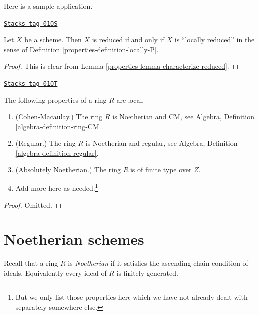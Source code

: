 Here is a sample application.

\begin{lemma}
\label{properties-lemma-reduced-is-locally-reduced}
\href{https://stacks.math.columbia.edu/tag/01OS}{\texttt{Stacks tag 01OS}}

Let $X$ be a scheme. Then $X$ is reduced if and only if $X$ is
``locally reduced'' in the sense of Definition \ref{properties-definition-locally-P}.
\end{lemma}

\begin{proof}

This is clear from Lemma \ref{properties-lemma-characterize-reduced}.
\end{proof}

\begin{lemma}
\label{properties-lemma-properties-local}
\href{https://stacks.math.columbia.edu/tag/01OT}{\texttt{Stacks tag 01OT}}

The following properties of a ring $R$ are local.
\begin{enumerate}
\item (Cohen-Macaulay.)
The ring $R$ is Noetherian and CM, see
Algebra, Definition \ref{algebra-definition-ring-CM}.
\item (Regular.)
The ring $R$ is Noetherian and regular, see
Algebra, Definition \ref{algebra-definition-regular}.
\item (Absolutely Noetherian.)
The ring $R$ is of finite type over $Z$.
\item Add more here as needed.\footnote{But we only list those properties
here which we have not already dealt with separately somewhere else.}
\end{enumerate}
\end{lemma}

\begin{proof}
Omitted.
\end{proof}

\section{Noetherian schemes}
\label{properties-section-noetherian}
Recall that a ring $R$ is {\it Noetherian} if it satisfies the ascending
chain condition of ideals. Equivalently every ideal of $R$ is finitely
generated.

